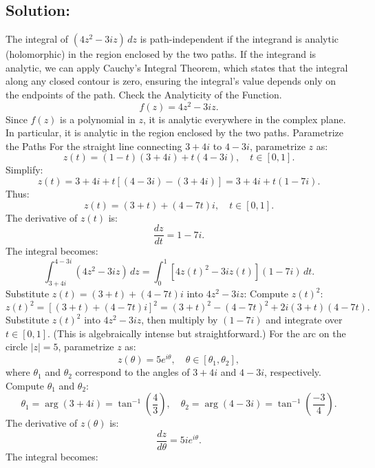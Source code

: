 \documentclass[12pt]{article}
\begin{document}
   \subsection*{Solution:}
        The integral of \( (4z^2 - 3iz) \, dz \) is path-independent if the integrand is analytic (holomorphic) in the region enclosed by the two paths. If the integrand is analytic, we can apply Cauchy's Integral Theorem, which states that the integral along any closed contour is zero, ensuring the integral's value depends only on the endpoints of the path.
        Check the Analyticity of the Function.
        \[
        f(z) = 4z^2 - 3iz.
        \]
        Since \(f(z)\) is a polynomial in \(z\), it is analytic everywhere in the complex plane. In particular, it is analytic in the region enclosed by the two paths.
        \newline Parametrize the Paths
        For the straight line connecting \(3 + 4i\) to \(4 - 3i\), parametrize \(z\) as:
        \[
        z(t) = (1 - t)(3 + 4i) + t(4 - 3i), \quad t \in [0, 1].
        \]
        Simplify:
        \[
        z(t) = 3 + 4i + t[(4 - 3i) - (3 + 4i)] = 3 + 4i + t(1 - 7i).
        \]
        Thus:
        \[
        z(t) = (3 + t) + (4 - 7t)i, \quad t \in [0, 1].
        \]
        The derivative of \(z(t)\) is:
        \[
        \frac{dz}{dt} = 1 - 7i.
        \]
        The integral becomes:
        \[
        \int_{3+4i}^{4-3i} (4z^2 - 3iz) \, dz = \int_0^1 \left[ 4z(t)^2 - 3i z(t) \right] (1 - 7i) \, dt.
        \]
        Substitute \(z(t) = (3 + t) + (4 - 7t)i\) into \(4z^2 - 3iz\):
        Compute \(z(t)^2\):
           \[
           z(t)^2 = [(3 + t) + (4 - 7t)i]^2 = (3 + t)^2 - (4 - 7t)^2 + 2i(3 + t)(4 - 7t).
           \]
        Substitute \(z(t)^2\) into \(4z^2 - 3iz\), then multiply by \((1 - 7i)\) and integrate over \(t \in [0, 1]\). (This is algebraically intense but straightforward.)
        \newline For the arc on the circle \(|z| = 5\), parametrize \(z\) as:
        \[
        z(\theta) = 5e^{i\theta}, \quad \theta \in [\theta_1, \theta_2],
        \]
        where \(\theta_1\) and \(\theta_2\) correspond to the angles of \(3 + 4i\) and \(4 - 3i\), respectively.
        Compute \(\theta_1\) and \(\theta_2\):
           \[
           \theta_1 = \arg(3 + 4i) = \tan^{-1}\left(\frac{4}{3}\right), \quad
           \theta_2 = \arg(4 - 3i) = \tan^{-1}\left(\frac{-3}{4}\right).
           \]
        The derivative of \(z(\theta)\) is:
           \[
           \frac{dz}{d\theta} = 5i e^{i\theta}.
           \]
        The integral becomes:
\end{document}
